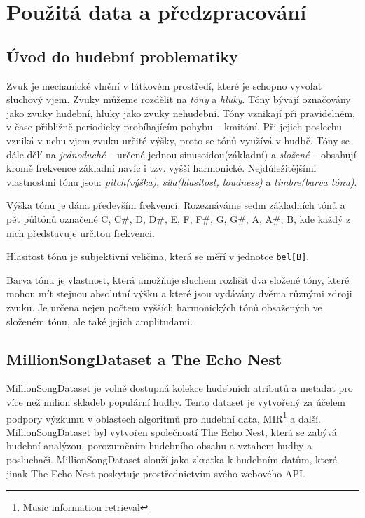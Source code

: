 \documentclass[thesis=M,czech]{FITthesis}[2012/06/26]
\begin{document}
\chapter{Použitá data a předzpracování}
\section{Úvod do hudební problematiky}
Zvuk je mechanické vlnění v látkovém prostředí, které je schopno vyvolat sluchový vjem. Zvuky můžeme rozdělit na \textit{tóny} a \textit{hluky}. Tóny bývají označovány jako zvuky hudební, hluky jako zvuky nehudební. Tóny vznikají při pravidelném, v čase přibližně periodicky probíhajícím pohybu -- kmitání. Při jejich poslechu vzniká v uchu vjem zvuku určité výšky, proto se tónů využívá v hudbě. Tóny se dále dělí na \textit{jednoduché} -- určené jednou sinusoidou(základní) a \textit{složené} -- obsahují kromě frekvence základní navíc i tzv. vyšší harmonické. Nejdůležitějšími vlastnostmi tónu jsou: \textit{pitch(výška)}, \textit{síla(hlasitost, loudness)} a \textit{timbre(barva tónu)}.

Výška tónu je dána především frekvencí. Rozeznáváme sedm základních tónů a pět půltónů označené C, C\#, D, D\#, E, F, F\#, G, G\#, A, A\#, B, kde každý z nich představuje určitou frekvenci.

Hlasitost tónu je subjektivní veličina, která se měří v jednotce \texttt{bel[B]}.

Barva tónu je vlastnost, která umožňuje sluchem rozlišit dva složené tóny, které mohou mít stejnou absolutní výšku a které jsou vydávány dvěma různými zdroji zvuku. Je určena nejen počtem vyšších harmonických tónů obsažených ve složeném tónu, ale také jejich amplitudami. \cite{zvuk-ency}
 



\section{MillionSongDataset a The Echo Nest}
MillionSongDataset je volně dostupná kolekce hudebních atributů a metadat pro více než milion skladeb populární hudby. Tento dataset je vytvořený za účelem podpory výzkumu v oblastech algoritmů pro hudební data, MIR\footnote{Music information retrieval} a další. MillionSongDataset byl vytvořen společností The Echo Nest, která se zabývá hudební analýzou, porozuměním hudebního obsahu a vztahem hudby a posluchači. MillionSongDataset slouží jako zkratka k hudebním datům, které jinak The Echo Nest poskytuje prostřednictvím svého webového API.
\end{document}
